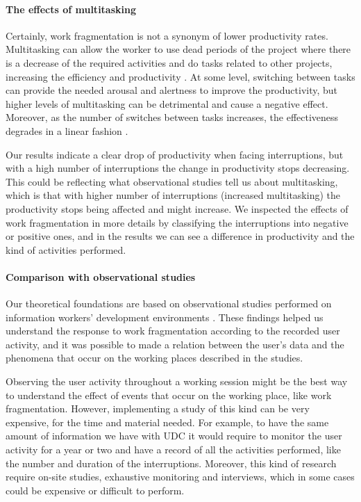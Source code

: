\documentclass[times]{smrauth}
\begin{document}
\paragraph{The effects of multitasking}
Certainly, work fragmentation is not a synonym of lower productivity rates. Multitasking can allow the worker to use dead periods of the project where there is a decrease of the required activities and do tasks related to other projects, increasing the efficiency and productivity \cite{ABV12}. At some level, switching between tasks can provide the needed arousal and alertness to improve the productivity, but higher levels of multitasking can be detrimental and cause a negative effect. Moreover, as the number of switches between tasks increases, the effectiveness degrades in a linear fashion \cite{AB12}. 

Our results indicate a clear drop of productivity when facing interruptions, but with a high number of interruptions the change in productivity stops decreasing. This could be reflecting what observational studies tell us about multitasking, which is that with higher number of interruptions (increased multitasking) the productivity stops being affected and might increase. %
We inspected  the effects of work fragmentation in more details by classifying the interruptions into negative or positive ones, and in the results we can see a difference in productivity and the kind of activities performed.

\paragraph{Comparison with observational studies}
Our theoretical foundations are based on observational studies performed on information workers' development environments \cite{MGH05, IH07, LVD06, PD10}. These findings helped us understand the response to work fragmentation according to the recorded user activity, and it was possible to made a relation between the user's data and the phenomena that occur on the working places described in the studies.

Observing the user activity throughout a working session might be the best way to understand the effect of events that occur on the working place, like work fragmentation. However, implementing a study of this kind can be very expensive, for the time and material needed. For example, to have the same amount of information we have with UDC it would require to monitor the user activity for a year or two and have a record of all the activities performed, like the number and duration of the interruptions. Moreover, this kind of research require on-site studies, exhaustive monitoring and interviews, which in some cases could be expensive or difficult to perform.
\end{document}
